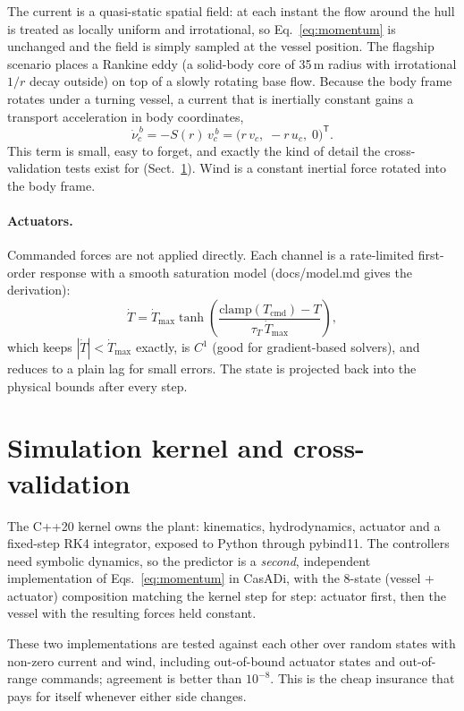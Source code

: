 \documentclass[10pt]{article}
\begin{document}
The current is a quasi-static spatial field: at each instant the flow
around the hull is treated as locally uniform and irrotational, so
Eq.~\eqref{eq:momentum} is unchanged and the field is simply sampled at
the vessel position. The flagship scenario places a Rankine eddy (a
solid-body core of 35\,m radius with irrotational $1/r$ decay outside) on
top of a slowly rotating base flow. Because the body frame rotates under a
turning vessel, a current that is inertially constant gains a transport
acceleration in body coordinates,
\begin{equation}
  \dot\nu_c^{\,b} = -S(r)\,v_c^{\,b}
  = \bigl(r\,v_c,\; -r\,u_c,\; 0\bigr)^\mathsf{T}.
\end{equation}
This term is small, easy to forget, and exactly the kind of detail the
cross-validation tests exist for (Sect.~\ref{sec:kernel}). Wind is a
constant inertial force rotated into the body frame.

\paragraph{Actuators.}
Commanded forces are not applied directly. Each channel is a rate-limited
first-order response with a smooth saturation model (docs/model.md
gives the derivation):
\begin{equation}
  \dot T = \dot T_{\max}\tanh\!\left(
    \frac{\mathrm{clamp}(T_{\mathrm{cmd}}) - T}{\tau_T\,\dot T_{\max}}
  \right),
\end{equation}
which keeps $|\dot T| < \dot T_{\max}$ exactly, is $C^1$ (good for
gradient-based solvers), and reduces to a plain lag for small errors. The
state is projected back into the physical bounds after every step.

\section{Simulation kernel and cross-validation}
\label{sec:kernel}
The C++20 kernel owns the plant: kinematics, hydrodynamics, actuator and a
fixed-step RK4 integrator, exposed to Python through pybind11. The
controllers need symbolic dynamics, so the predictor is a \emph{second},
independent implementation of Eqs.~\eqref{eq:momentum} in CasADi, with the
8-state (vessel + actuator) composition matching the kernel step for step:
actuator first, then the vessel with the resulting forces held constant.

These two implementations are tested against each other over random states
with non-zero current and wind, including out-of-bound actuator states and
out-of-range commands; agreement is better than $10^{-8}$. This is the
cheap insurance that pays for itself whenever either side changes.
\end{document}
